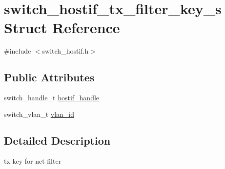 \hypertarget{structswitch__hostif__tx__filter__key__s}{\section{switch\+\_\+hostif\+\_\+tx\+\_\+filter\+\_\+key\+\_\+s Struct Reference}
\label{structswitch__hostif__tx__filter__key__s}
}


{\ttfamily \#include $<$switch\+\_\+hostif.\+h$>$}

\subsection*{Public Attributes}
\begin{DoxyCompactItemize}
\item 
switch\+\_\+handle\+\_\+t \hyperlink{structswitch__hostif__tx__filter__key__s_aa34efd8246c1d9429c52866591e2f02c}{hostif\+\_\+handle}
\item 
switch\+\_\+vlan\+\_\+t \hyperlink{structswitch__hostif__tx__filter__key__s_aecf8c776c606ae3aa8cd8ca509208c6e}{vlan\+\_\+id}
\end{DoxyCompactItemize}


\subsection{Detailed Description}
tx key for net filter 

